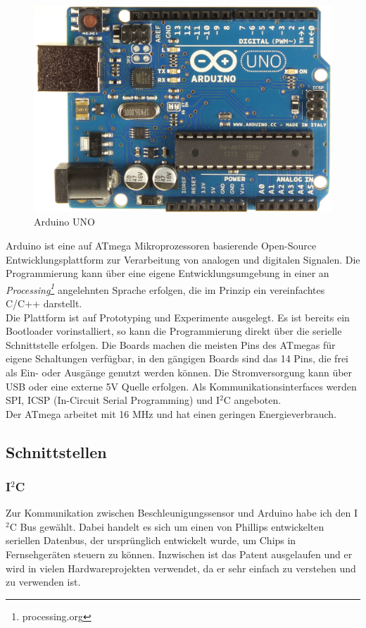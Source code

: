 \documentclass[12pt,a4paper]{scrartcl}
\begin{document}
\begin{figure}[ht]
\centering
\includegraphics[scale=.2]{hardwareimages/ArduinoUno_R3_Front.jpg}
\caption{Arduino UNO}
\label{Arduino}
\end{figure}


Arduino ist eine auf ATmega Mikroprozessoren basierende Open-Source Entwicklungsplattform zur Verarbeitung von analogen und digitalen Signalen. Die Programmierung kann über eine eigene Entwicklungsumgebung in einer an \textit{Processing\footnote{processing.org}} angelehnten Sprache erfolgen, die im Prinzip ein vereinfachtes C/C++ darstellt.\\
Die Plattform ist auf Prototyping und Experimente ausgelegt. Es ist bereits ein Bootloader vorinstalliert, so kann die Programmierung direkt über die serielle Schnittstelle erfolgen. Die Boards machen die meisten Pins des ATmegas für eigene Schaltungen verfügbar, in den gängigen Boards sind das 14 Pins, die frei als Ein- oder Ausgänge genutzt werden können.
Die Stromversorgung kann über USB oder eine externe 5V Quelle erfolgen. Als Kommunikationsinterfaces werden SPI, ICSP (In-Circuit Serial Programming) und I$^2$C angeboten.\\
Der ATmega arbeitet mit 16 MHz und hat einen geringen Energieverbrauch.


\subsection{Schnittstellen}

\subsubsection{I$^2$C}
Zur Kommunikation zwischen Beschleunigungssensor und Arduino habe ich den  I$^2$C Bus \citep{:2012fj} gewählt.
Dabei handelt es sich um einen von Phillips entwickelten seriellen Datenbus, der ursprünglich entwickelt wurde, um Chips in Fernsehgeräten steuern zu können. Inzwischen ist das Patent ausgelaufen und er wird in vielen Hardwareprojekten verwendet, da er sehr einfach zu verstehen und zu verwenden ist. 
\end{document}
